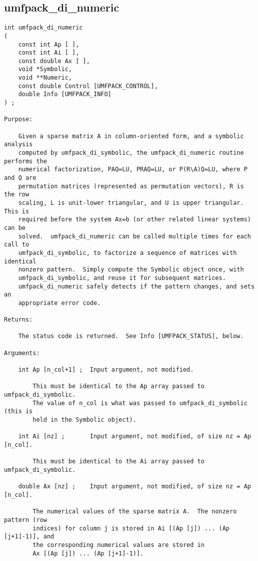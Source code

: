 \documentclass[11pt]{article}
\begin{document}
\newpage
\subsection{umfpack\_di\_numeric}

{\footnotesize
\begin{verbatim}
int umfpack_di_numeric
(
    const int Ap [ ],
    const int Ai [ ],
    const double Ax [ ],
    void *Symbolic,
    void **Numeric,
    const double Control [UMFPACK_CONTROL],
    double Info [UMFPACK_INFO]
) ;

Purpose:

    Given a sparse matrix A in column-oriented form, and a symbolic analysis
    computed by umfpack_di_symbolic, the umfpack_di_numeric routine performs the
    numerical factorization, PAQ=LU, PRAQ=LU, or P(R\A)Q=LU, where P and Q are
    permutation matrices (represented as permutation vectors), R is the row
    scaling, L is unit-lower triangular, and U is upper triangular.  This is
    required before the system Ax=b (or other related linear systems) can be
    solved.  umfpack_di_numeric can be called multiple times for each call to
    umfpack_di_symbolic, to factorize a sequence of matrices with identical
    nonzero pattern.  Simply compute the Symbolic object once, with
    umfpack_di_symbolic, and reuse it for subsequent matrices.
    umfpack_di_numeric safely detects if the pattern changes, and sets an
    appropriate error code.

Returns:

    The status code is returned.  See Info [UMFPACK_STATUS], below.

Arguments:

    int Ap [n_col+1] ;  Input argument, not modified.

        This must be identical to the Ap array passed to umfpack_di_symbolic.
        The value of n_col is what was passed to umfpack_di_symbolic (this is
        held in the Symbolic object).

    int Ai [nz] ;       Input argument, not modified, of size nz = Ap [n_col].

        This must be identical to the Ai array passed to umfpack_di_symbolic.

    double Ax [nz] ;    Input argument, not modified, of size nz = Ap [n_col].

        The numerical values of the sparse matrix A.  The nonzero pattern (row
        indices) for column j is stored in Ai [(Ap [j]) ... (Ap [j+1]-1)], and
        the corresponding numerical values are stored in
        Ax [(Ap [j]) ... (Ap [j+1]-1)].


\end{verbatim}}
\end{document}
